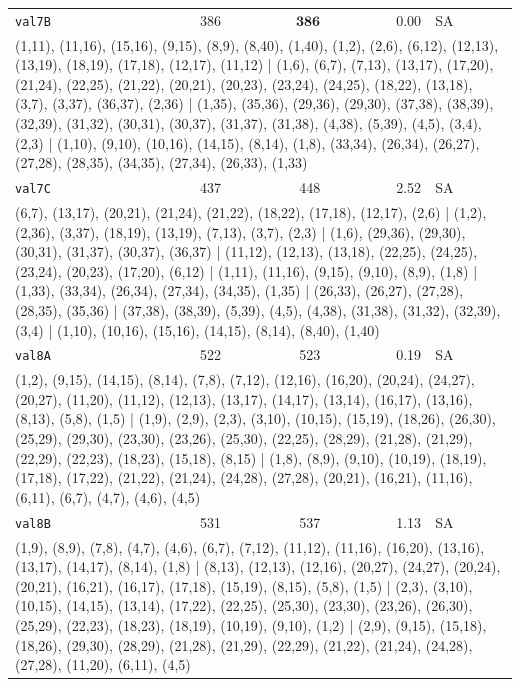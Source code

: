 \begin{longtable}{lrrrl}
\texttt{val7B} & 386 & $\mathbf{386}$ & 0.00 & SA \\
\multicolumn{5}{p{0.96\linewidth}}{\tiny\raggedright\arraybackslash (1,11), (11,16), (15,16), (9,15), (8,9), (8,40), (1,40), (1,2), (2,6), (6,12), (12,13), (13,19), (18,19), (17,18), (12,17), (11,12) | (1,6), (6,7), (7,13), (13,17), (17,20), (21,24), (22,25), (21,22), (20,21), (20,23), (23,24), (24,25), (18,22), (13,18), (3,7), (3,37), (36,37), (2,36) | (1,35), (35,36), (29,36), (29,30), (37,38), (38,39), (32,39), (31,32), (30,31), (30,37), (31,37), (31,38), (4,38), (5,39), (4,5), (3,4), (2,3) | (1,10), (9,10), (10,16), (14,15), (8,14), (1,8), (33,34), (26,34), (26,27), (27,28), (28,35), (34,35), (27,34), (26,33), (1,33)} \\[2pt]
\texttt{val7C} & 437 & 448 & 2.52 & SA \\
\multicolumn{5}{p{0.96\linewidth}}{\tiny\raggedright\arraybackslash (6,7), (13,17), (20,21), (21,24), (21,22), (18,22), (17,18), (12,17), (2,6) | (1,2), (2,36), (3,37), (18,19), (13,19), (7,13), (3,7), (2,3) | (1,6), (29,36), (29,30), (30,31), (31,37), (30,37), (36,37) | (11,12), (12,13), (13,18), (22,25), (24,25), (23,24), (20,23), (17,20), (6,12) | (1,11), (11,16), (9,15), (9,10), (8,9), (1,8) | (1,33), (33,34), (26,34), (27,34), (34,35), (1,35) | (26,33), (26,27), (27,28), (28,35), (35,36) | (37,38), (38,39), (5,39), (4,5), (4,38), (31,38), (31,32), (32,39), (3,4) | (1,10), (10,16), (15,16), (14,15), (8,14), (8,40), (1,40)} \\[2pt]
\texttt{val8A} & 522 & 523 & 0.19 & SA \\
\multicolumn{5}{p{0.96\linewidth}}{\tiny\raggedright\arraybackslash (1,2), (9,15), (14,15), (8,14), (7,8), (7,12), (12,16), (16,20), (20,24), (24,27), (20,27), (11,20), (11,12), (12,13), (13,17), (14,17), (13,14), (16,17), (13,16), (8,13), (5,8), (1,5) | (1,9), (2,9), (2,3), (3,10), (10,15), (15,19), (18,26), (26,30), (25,29), (29,30), (23,30), (23,26), (25,30), (22,25), (28,29), (21,28), (21,29), (22,29), (22,23), (18,23), (15,18), (8,15) | (1,8), (8,9), (9,10), (10,19), (18,19), (17,18), (17,22), (21,22), (21,24), (24,28), (27,28), (20,21), (16,21), (11,16), (6,11), (6,7), (4,7), (4,6), (4,5)} \\[2pt]
\texttt{val8B} & 531 & 537 & 1.13 & SA \\
\multicolumn{5}{p{0.96\linewidth}}{\tiny\raggedright\arraybackslash (1,9), (8,9), (7,8), (4,7), (4,6), (6,7), (7,12), (11,12), (11,16), (16,20), (13,16), (13,17), (14,17), (8,14), (1,8) | (8,13), (12,13), (12,16), (20,27), (24,27), (20,24), (20,21), (16,21), (16,17), (17,18), (15,19), (8,15), (5,8), (1,5) | (2,3), (3,10), (10,15), (14,15), (13,14), (17,22), (22,25), (25,30), (23,30), (23,26), (26,30), (25,29), (22,23), (18,23), (18,19), (10,19), (9,10), (1,2) | (2,9), (9,15), (15,18), (18,26), (29,30), (28,29), (21,28), (21,29), (22,29), (21,22), (21,24), (24,28), (27,28), (11,20), (6,11), (4,5)} \\[2pt]

\end{longtable}
